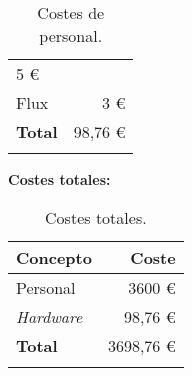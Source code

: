 \begin{longtable}[]{@{}lr@{}}
\begin{minipage}[t]{0.20\columnwidth}
5 \euro{}\strut
\end{minipage}\tabularnewline
\begin{minipage}[t]{0.38\columnwidth}\raggedright\strut
Flux\strut
\end{minipage} & \begin{minipage}[t]{0.20\columnwidth}\raggedright\strut
3 \euro{}\strut
\end{minipage}\tabularnewline
\midrule
\begin{minipage}[t]{0.38\columnwidth}\raggedright\strut
\textbf{Total}\strut
\end{minipage} & \begin{minipage}[t]{0.20\columnwidth}\raggedright\strut
98,76 \euro{}\strut
\end{minipage}\tabularnewline
\bottomrule
\caption{Costes de personal.}
\end{longtable}



\textbf{Costes totales:}

\begin{longtable}[]{@{}lr@{}}
\toprule
\begin{minipage}[b]{0.38\columnwidth}\raggedright\strut
\textbf{Concepto}\strut
\end{minipage} & \begin{minipage}[b]{0.20\columnwidth}\raggedright\strut
\textbf{Coste}\strut
\end{minipage}\tabularnewline
\midrule
\endhead
\begin{minipage}[t]{0.38\columnwidth}\raggedright\strut
Personal\strut
\end{minipage} & \begin{minipage}[t]{0.20\columnwidth}\raggedright\strut
3600 \euro{}\strut
\end{minipage}\tabularnewline
\begin{minipage}[t]{0.38\columnwidth}\raggedright\strut
\emph{Hardware}\strut
\end{minipage} & \begin{minipage}[t]{0.20\columnwidth}\raggedright\strut
98,76 \euro{}\strut
\end{minipage}\tabularnewline
\midrule
\begin{minipage}[t]{0.38\columnwidth}\raggedright\strut
\textbf{Total}\strut
\end{minipage} & \begin{minipage}[t]{0.20\columnwidth}\raggedright\strut
3698,76 \euro{}\strut
\end{minipage}\tabularnewline
\bottomrule
\caption{Costes totales.}
\end{longtable}


